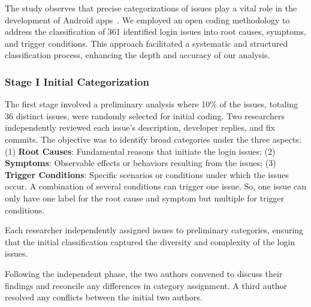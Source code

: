  The study observes that precise categorizations of issues play a vital role in the development of Android apps~\cite{10.1145/3386685}. We employed an open coding methodology to address the classification of 361 identified login issues into root causes, symptoms, and trigger conditions. This approach facilitated a systematic and structured classification process, enhancing the depth and accuracy of our analysis. 



\subsubsection{Stage I Initial Categorization}

The first stage involved a preliminary analysis where 10\% of the issues, totaling 36 distinct issues, were randomly selected for initial coding. Two researchers independently reviewed each issue’s description, developer replies, and fix commits. The objective was to identify broad categories under the three aspects: (1) \textbf{Root Causes}: Fundamental reasons that initiate the login issues; (2) \textbf{Symptoms}: Observable effects or behaviors resulting from the issues; (3) \textbf{Trigger Conditions}: Specific scenarios or conditions under which the issues occur. A combination of several conditions can trigger one issue. So, one issue can only have one label for the root cause and symptom but multiple for trigger conditions. %


Each researcher independently assigned issues to preliminary categories, ensuring that the initial classification captured the diversity and complexity of the login issues.

Following the independent phase, the two authors convened to discuss their findings and reconcile any differences in category assignment. A third author resolved any conflicts between the initial two authors. 

